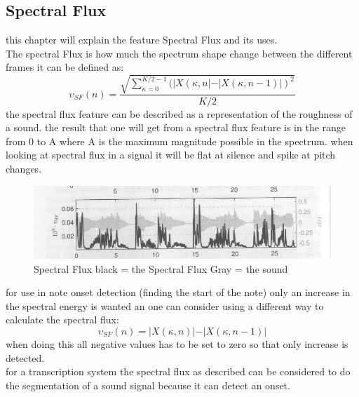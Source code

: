\subsection{Spectral Flux}
this chapter will explain the feature Spectral Flux and its uses.\\
The spectral Flux is how much the spectrum shape change between the different frames it can be defined as\citep{ACA}:
\begin{equation}\label{Spectral Flux eq}
	\upsilon_{SF}(n) = \frac{\sqrt{\displaystyle\sum_{\kappa=0}^{K/2-1}(\vert X(\kappa,n\vert-\vert X(\kappa,n-1)\vert)^2}}{K/2}
\end{equation} 
the spectral flux feature can be described as a representation of the roughness of a sound. the result that one will get from a spectral flux feature is in the range from 0 to A where A is the maximum magnitude possible in the spectrum\citep{ACA}. when looking at spectral flux in a signal it will be flat at silence and spike at pitch changes\citep{ACA}.
\begin{figure}[h]
	\begin{center}
		\includegraphics[scale = 0.5]{fig/spectral_flux.jpg}
		\caption{Spectral Flux black = the Spectral Flux Gray = the sound \citep{ACA}}
		\label{Spectral flux pic}
	\end{center}
\end{figure}
for use in note onset detection (finding the start of the note) only an increase in the spectral energy is wanted an one can consider using a different way to calculate the spectral flux\citep{ACA}:
\begin{equation}
	\upsilon_{SF}(n) = \vert X(\kappa,n)\vert-\vert X(\kappa,n-1)\vert
\end{equation}
when doing this all negative values has to be set to zero so that only increase is detected\citep{ACA}.
\\
for a transcription system the spectral flux as described can be considered to do the segmentation of a sound signal because it can detect an onset. 
 
